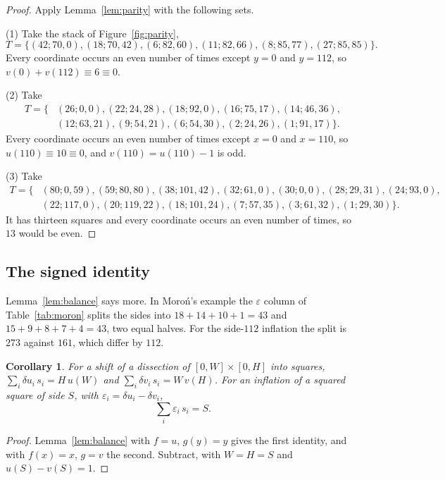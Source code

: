 \documentclass[11pt]{amsart}
\newtheorem{cor}[thm]{Corollary}
\theoremstyle{definition}
\begin{document}
\begin{proof}
Apply Lemma~\ref{lem:parity} with the following sets.

(1) Take the stack of Figure~\ref{fig:parity},
\[
T=\{(42;70,0),(18;70,42),(6;82,60),(11;82,66),(8;85,77),(27;85,85)\}.
\]
Every coordinate occurs an even number of times except $y=0$ and $y=112$, so
$v(0)+v(112)\equiv6\equiv0$.

(2) Take
\[
\begin{aligned}
T=\{&(26;0,0),(22;24,28),(18;92,0),(16;75,17),(14;46,36),\\
&(12;63,21),(9;54,21),(6;54,30),(2;24,26),(1;91,17)\}.
\end{aligned}
\]
Every coordinate occurs an even number of times except $x=0$ and $x=110$, so $u(110)\equiv10\equiv0$,
and $v(110)=u(110)-1$ is odd.

(3) Take
\[
\begin{aligned}
T=\{&(80;0,59),(59;80,80),(38;101,42),(32;61,0),(30;0,0),(28;29,31),(24;93,0),\\
&(22;117,0),(20;119,22),(18;101,24),(7;57,35),(3;61,32),(1;29,30)\}.
\end{aligned}
\]
It has thirteen squares and every coordinate occurs an even number of times, so $13$ would be even.
\end{proof}

\subsection*{The signed identity} Lemma~\ref{lem:balance} says more. In Moro\'n's example the
$\varepsilon$ column of Table~\ref{tab:moron} splits the sides into $18+14+10+1=43$ and
$15+9+8+7+4=43$, two equal halves. For the side-$112$ inflation the split is $273$ against
$161$, which differ by $112$.

\begin{cor}\label{cor:signed}
For a shift of a dissection of $[0,W]\times[0,H]$ into squares,
$\sum_i\delta u_i\,s_i=H\,u(W)$ and $\sum_i\delta v_i\,s_i=W\,v(H)$. For an inflation of a squared
square of side $S$, with $\varepsilon_i=\delta u_i-\delta v_i$,
\[
\sum_i\varepsilon_i\,s_i=S.
\]
\end{cor}

\begin{proof}
Lemma~\ref{lem:balance} with $f=u$, $g(y)=y$ gives the first identity, and with $f(x)=x$, $g=v$ the
second. Subtract, with $W=H=S$ and $u(S)-v(S)=1$.
\end{proof}
\end{document}
